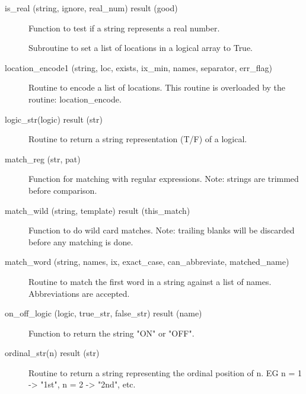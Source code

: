 \begin{description}
\label{r:is.real}
\item[is_real (string, ignore, real_num) result (good)] \Newline 
Function to test if a string represents a real number.

\label{r:location.decode}
\item[\protect\parbox{6in}{
    location_decode (string, array, ix_min, num, names, exact_case, \\
    \hspace*{1in} can_abbreviate, print_err) }] \Newline 
Subroutine to set a list of locations in a logical array to True.

\label{r:location.encode1}
\item[location_encode1 (string, loc, exists, ix_min, names, separator, err_flag)] \Newline 
Routine to encode a list of locations. 
This routine is overloaded by the routine: location_encode.

\label{r:logic.str}
\item[logic_str(logic) result (str)] \Newline 
Routine to return a string representation (T/F) of a logical.

\label{r:match.reg}
\item[match_reg (str, pat)] \Newline 
Function for matching with regular expressions.
Note: strings are trimmed before comparison.

\label{r:match.wild}
\item[match_wild (string, template) result (this_match)] \Newline 
Function to do wild card matches. Note: trailing blanks will be discarded
before any matching is done.

\label{r:match.word}
\item[match_word (string, names, ix, exact_case, can_abbreviate, matched_name)] \Newline 
Routine to match the first word in a string against a list of names.
Abbreviations are accepted.  

\label{r:on.off.logic}
\item[on_off_logic (logic, true_str, false_str) result (name)] \Newline 
Function to return the string "ON" or "OFF".

\label{r:ordinal.str}
\item[ordinal_str(n) result (str)] \Newline 
Routine to return a string representing the ordinal position of n.
EG n = 1 -> "1st", n = 2 -> "2nd", etc.


\end{description}
